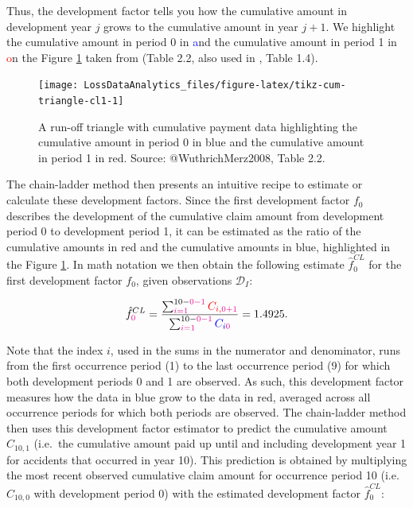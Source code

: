 \documentclass[]{book}
\begin{document}
Thus, the development factor tells you how the cumulative amount in
development year \(j\) grows to the cumulative amount in year \(j+1\).
We highlight the cumulative amount in period 0 in \textcolor{blue} and
the cumulative amount in period 1 in \textcolor{red} on the Figure
\ref{fig:tikz-cum-triangle-cl1} taken from \citet{WuthrichMerz2008}
(Table 2.2, also used in \citet{WuthrichMerz2015}, Table 1.4).

\begin{figure}

{\centering \texttt{[image: LossDataAnalytics\_files/figure-latex/tikz-cum-triangle-cl1-1]} 

}

\caption{A run-off triangle with cumulative payment data highlighting the cumulative amount in period 0 in blue and the cumulative amount in period 1 in red. Source: @WuthrichMerz2008, Table 2.2.}\label{fig:tikz-cum-triangle-cl1}
\end{figure}

The chain-ladder method then presents an intuitive recipe to estimate or
calculate these development factors. Since the first development factor
\(f_0\) describes the development of the cumulative claim amount from
development period 0 to development period 1, it can be estimated as the
ratio of the cumulative amounts in red and the cumulative amounts in
blue, highlighted in the Figure \ref{fig:tikz-cum-triangle-cl1}. In math
notation we then obtain the following estimate \(\hat{f}_0^{CL}\) for
the first development factor \(f_0\), given observations
\(\mathcal{D}_I\):

\[
\hat{f}^{CL}_{\color{magenta}{0}} = \frac{\sum_{i=1}^{10-\color{magenta}{0}-1} \color{red}{C_{i,\color{magenta}{0}+1}}}{\sum_{i=1}^{10-\color{magenta}{0}-1} \color{blue}{C_{i\color{magenta}{0}}}}= 1.4925.
\]

Note that the index \(i\), used in the sums in the numerator and
denominator, runs from the first occurrence period (1) to the last
occurrence period (9) for which both development periods 0 and 1 are
observed. As such, this development factor measures how the data in blue
grow to the data in red, averaged across all occurrence periods for
which both periods are observed. The chain-ladder method then uses this
development factor estimator to predict the cumulative amount
\(C_{10,1}\) (i.e.~the cumulative amount paid up until and including
development year 1 for accidents that occurred in year 10). This
prediction is obtained by multiplying the most recent observed
cumulative claim amount for occurrence period 10 (i.e. \(C_{10,0}\) with
development period 0) with the estimated development factor
\(\hat{f}^{CL}_0\):
\end{document}
